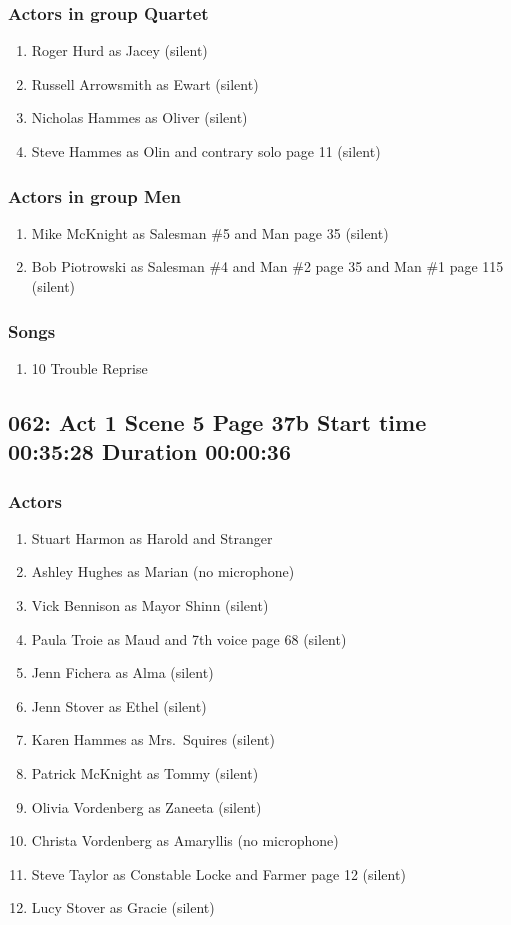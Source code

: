 \subsubsection{Actors in group Quartet}
\begin{enumerate}
\item Roger Hurd as Jacey (silent)
\item Russell Arrowsmith as Ewart (silent)
\item Nicholas Hammes as Oliver (silent)
\item Steve Hammes as Olin and contrary solo page 11 (silent)
\end{enumerate}
\subsubsection{Actors in group Men}
\begin{enumerate}
\item Mike McKnight as Salesman \#5 and Man page 35 (silent)
\item Bob Piotrowski as Salesman \#4 and Man \#2 page 35 and Man \#1 page 115 (silent)
\end{enumerate}

\subsubsection{Songs}
\begin{enumerate}
\item 10 Trouble Reprise
\end{enumerate}
\subsection{062: Act 1 Scene 5 Page 37b Start time 00:35:28 Duration 00:00:36}

\subsubsection{Actors}
\begin{enumerate}
\item Stuart Harmon as Harold and Stranger
\item Ashley Hughes as Marian (no microphone)
\item Vick Bennison as Mayor Shinn (silent)
\item Paula Troie as Maud and 7th voice page 68 (silent)
\item Jenn Fichera as Alma (silent)
\item Jenn Stover as Ethel (silent)
\item Karen Hammes as Mrs.~Squires (silent)
\item Patrick McKnight as Tommy (silent)
\item Olivia Vordenberg as Zaneeta (silent)
\item Christa Vordenberg as Amaryllis (no microphone)
\item Steve Taylor as Constable Locke and Farmer page 12 (silent)
\item Lucy Stover as Gracie (silent)
\end{enumerate}
